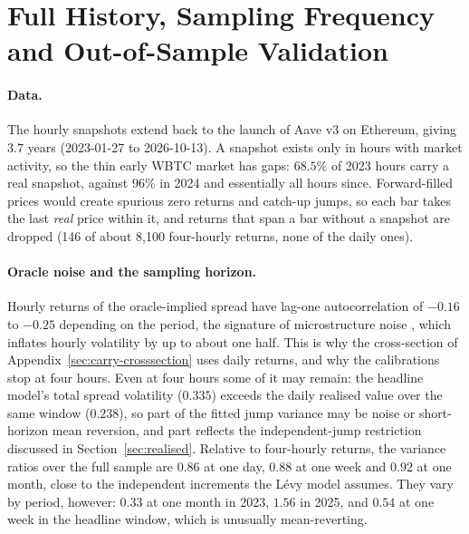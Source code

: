 \documentclass[11pt]{article}
\theoremstyle{plain}
\theoremstyle{definition}
\theoremstyle{remark}
\begin{document}
\section{Full History, Sampling Frequency and Out-of-Sample Validation}\label{sec:full-history}

\paragraph{Data.} The hourly snapshots extend back to the launch of Aave v3 on Ethereum, giving
$3.7$ years (2023-01-27 to 2026-10-13). A snapshot exists only in hours with market activity, so
the thin early WBTC market has gaps: $68.5\%$ of 2023 hours carry a real snapshot, against $96\%$ in
2024 and essentially all hours since. Forward-filled prices would create spurious zero returns and
catch-up jumps, so each bar takes the last \emph{real} price within it, and returns that span a bar
without a snapshot are dropped (146 of about 8{,}100 four-hourly returns, none of the daily ones).

\paragraph{Oracle noise and the sampling horizon.} Hourly returns of the oracle-implied spread have
lag-one autocorrelation of $-0.16$ to $-0.25$ depending on the period, the signature of microstructure noise
\citep{AitSahaliaMyklandZhang2005}, which inflates hourly volatility by up to about one half. This is why
the cross-section of Appendix~\ref{sec:carry-crosssection} uses daily returns, and why the
calibrations stop at four hours. Even at four hours some of it may remain: the headline model's total
spread volatility ($0.335$) exceeds the daily realised value over the same window ($0.238$), so part
of the fitted jump variance may be noise or short-horizon mean reversion, and part reflects the
independent-jump restriction discussed in Section~\ref{sec:realised}. Relative to four-hourly returns, the variance ratios
\citep{LoMacKinlay1988} over the full sample are $0.86$ at one day, $0.88$ at one week and $0.92$
at one month, close to the independent increments the L\'evy model assumes. They vary by period,
however: $0.33$ at one month in 2023, $1.56$ in 2025, and $0.54$ at one week in the headline window,
which is unusually mean-reverting.
\end{document}
